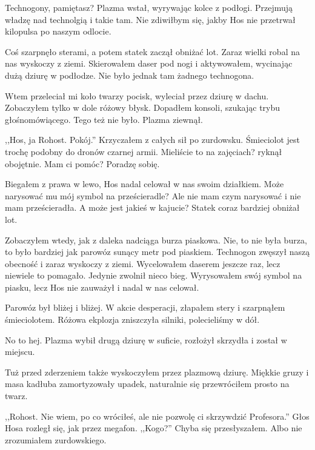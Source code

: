 \begin{dialogue}
\ds{} Technogony, pamiętasz? \dm{} Plazma wstał, wyrywając kolce z podłogi. \dm{} Przejmują władzę nad technolgią i takie tam. Nie zdiwiłbym się, jakby Hos nie przetrwał kilopulsa po naszym odlocie.
\end{dialogue}
Coś szarpnęło sterami, a potem statek zaczął obniżać lot.
Zaraz wielki robal na nas wyskoczy z ziemi.
Skierowałem daser pod nogi i aktywowałem, wycinając dużą dziurę w podłodze.
Nie było jednak tam żadnego technogona.

Wtem przeleciał mi koło twarzy pocisk, wyleciał przez dziurę w dachu. 
Zobaczyłem tylko w dole różowy błysk.
Dopadłem konsoli, szukając trybu głośnomówiącego.
Tego też nie było.
Plazma ziewnął.

\begin{dialogue}
\ds{} ,,Hos, ja Rohost. Pokój.'' \dm{} Krzyczałem z całych sił po zurdowsku.
\ds{} Śmieciolot jest trochę podobny do dronów czarnej armii. Mieliście to na zajęciach? \dm{} ryknął obojętnie. \dm{} Mam ci pomóc?
\ds{} Poradzę sobię.
\end{dialogue}

Biegałem z prawa w lewo, Hos nadal celował w nas swoim działkiem.
Może narysować mu mój symbol na prześcieradle? Ale nie mam czym narysować i nie mam prześcieradła.
A może jest jakieś w kajucie?
Statek coraz bardziej obniżał lot.

Zobaczyłem wtedy, jak z daleka nadciąga burza piaskowa.
Nie, to nie była burza, to było bardziej jak parowóz sunący metr pod piaskiem.
Technogon zwęszył naszą obecność i zaraz wyskoczy z ziemi.
Wycelowałem daserem jeszcze raz, lecz niewiele to pomagało. Jedynie zwolnił nieco bieg.
Wyrysowałem swój symbol na piasku, lecz Hos nie zauważył i nadal w nas celował.

Parowóz był bliżej i bliżej.
W akcie desperacji, złapałem stery i szarpnąłem śmieciolotem.
Różowa ekplozja zniszczyła silniki, polecieliśmy w dół.
\begin{dialogue}
\ds{} No to hej. \dm{} Plazma wybił drugą dziurę w suficie, rozłożył skrzydła i został w miejscu.
\end{dialogue}

Tuż przed zderzeniem także wyskoczyłem przez plazmową dziurę.
Miękkie gruzy i masa kadłuba zamortyzowały upadek, naturalnie się przewróciłem prosto na twarz.

\begin{dialogue}
\ds{} ,,Rohost. Nie wiem, po co wróciłeś, ale nie pozwolę ci skrzywdzić Profesora.'' \dm{} Głos Hosa rozległ się, jak przez megafon.
\ds{} ,,Kogo?'' \dm{} Chyba się przesłyszałem. Albo nie zrozumiałem zurdowskiego.
\end{dialogue}

